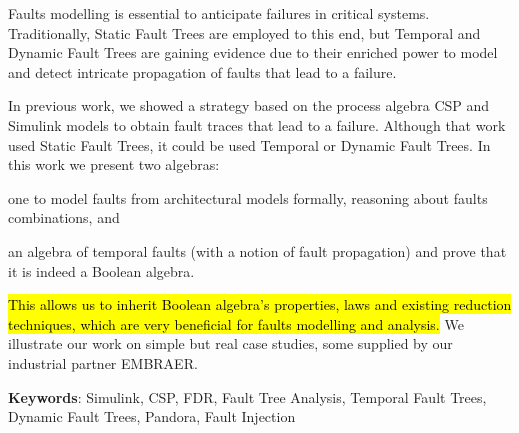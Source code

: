 \documentclass[12pt,openright,twoside,a4paper,oldfontcommands,english,brazil,draft]{abntex2}
\renewcommand{\listadesiglasname}{List of abbreviations and acronyms}
\theoremstyle{theo}
\begin{document}
\begin{resumo}
Faults modelling is essential to anticipate failures in critical systems.
Traditionally, Static Fault Trees are employed to this end, but Temporal and Dynamic Fault Trees are gaining evidence due to their enriched power to model and detect intricate propagation of faults that lead to a failure.

In previous work, we showed a strategy based on the process algebra CSP and Simulink models to obtain fault traces that lead to a failure.
Although that work used Static Fault Trees, it could be used Temporal or Dynamic Fault Trees.
In this work we present two algebras:
\begin{alineasinline}
  \item one to model faults from architectural models formally, reasoning about faults combinations, and
  \item an algebra of temporal faults (with a notion of fault propagation) and prove that it is indeed a Boolean algebra.
\end{alineasinline}
\hl{This allows us to inherit Boolean algebra's properties, laws and existing reduction techniques, which are very beneficial for faults modelling and analysis.}
We illustrate our work on simple but real case studies, some supplied by our industrial partner EMBRAER.

\vspace{\onelineskip}
\noindent
{}
\textbf{Keywords}: Simulink, CSP, FDR, Fault Tree Analysis, Temporal Fault Trees, Dynamic Fault Trees, Pandora, Fault Injection
\end{resumo}

\listoffigures*
\cleardoublepage

\listoftables*
\cleardoublepage

%

\acresetall
\printacronyms[name={\listadesiglasname{}},heading=chapter*,exclude-classes={gate}]
\acresetall
\cleardoublepage

\printacronyms[name={\Acl*{FT} gates},heading=chapter*,include-classes={gate}]
\acresetall
\cleardoublepage
\end{document}
